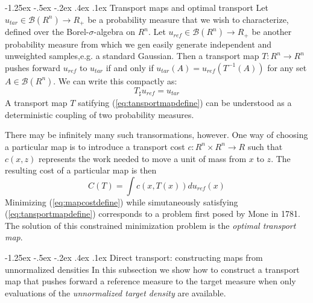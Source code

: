 \documentclass[a4paper, 11pt]{article}
\makeatletter
\newcommand{\xiaosihao}{\fontsize{12pt}{\baselineskip}\selectfont}
\renewcommand\subsection{\@startsection{subsection}{1}{\z@}%
{-1.25ex \@plus -.5ex \@minus -.2ex}%
{.4ex \@plus .1ex}%
{\normalfont\xiaosihao\CJKfamily{hei}}}
\makeatother
\begin{document}
\begin{CJK}{UTF8}{gbsn}
\subsection{Transport maps and optimal transport}
Let $u_{tar}\in \mathcal{B}(R^n) \rightarrow R_{+}$
be a probability measure that we wish to
characterize, defined over the Borel-$\sigma$-algebra on $R^n$.
Let $u_{ref}\in \mathcal{B}(R^n) \rightarrow R_{+}$
be another probability measure from which we gen easily generate independent and unweighted samples,e.g. a standard Gaussian. Then a transport map $T: R^n \rightarrow R^n$ pushes forward $u_{ref}$ to $u_{tar}$ if and only if $u_{tar}(A) = u_{ref}(T^{-1}(A))$ for any set $A \in \mathcal{B}(R^n)$. We can write this compactly as:
\begin{equation}\label{eq:tansportmapdefine}
T_{\sharp}u_{ref} = u_{tar}
\end{equation}
A transport map $T$ satifying (\ref{eq:tansportmapdefine}) can be understood as a deterministic coupling of two probability measures.

There may be infinitely many such transormations, however. One way of choosing a particular map is to introduce a transport cost $c:R^n \times R^n \rightarrow R$ such that $c(x,z)$ represents the work needed to move a unit of mass from $x$ to $z$. The resulting cost of a particular map is then
\begin{equation}\label{eq:mapcostdefine}
C(T) = \int c(x,T(x))du_{ref}(x)
\end{equation}
Minimizing (\ref{eq:mapcostdefine}) while simutaneously satisfying (\ref{eq:tansportmapdefine}) corresponds to a problem first posed by Mone in 1781. The solution of this constrained minimization problem is the \emph{optimal transport map}.

\subsection{Direct transport: constructing maps from unnormalized densities}
In this subsection we show how to construct a transport map that pushes forward a reference measure to the target measure when only evaluations of the \emph{unnormalized target density} are available.

\end{CJK}
\end{document}
